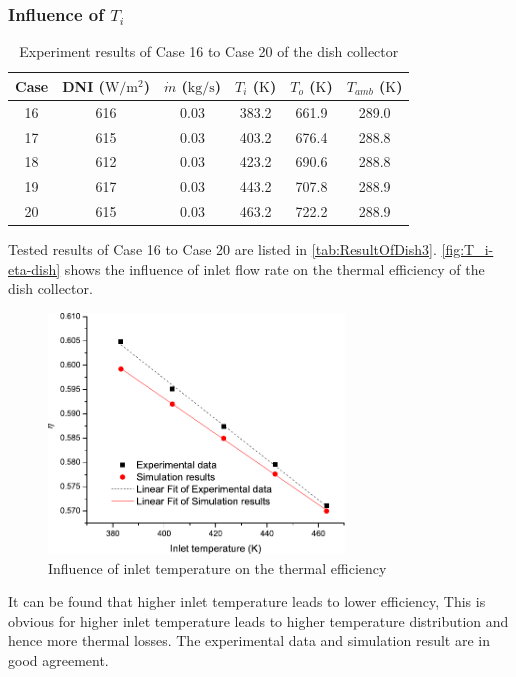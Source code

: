 \subsubsection{Influence of $T_i$}

\begin{table}[htbp]\footnotesize
	\caption{Experiment results of Case 16 to Case 20 of the dish collector}
	\centering
	\begin{tabular}{cccccc}
		\toprule
		Case	& DNI ($\mathrm{W/m^2}$)	&	$\dot{m}$ ($\mathrm{kg/s}$)			&	$T_i$ ($\mathrm{K}$)	&	$T_o$ ($\mathrm{K}$)		&	$T_{amb}$ ($\mathrm{K}$)\\
		\midrule
		16	&	616	&	0.03	&	383.2	&	661.9	&	289.0\\
		17	&	615	&	0.03	&	403.2	&	676.4	&	288.8\\
		18	&	612	&	0.03	&	423.2	&	690.6	&	288.8	\\
		19	&	617	&	0.03	&	443.2	&	707.8	&	288.9\\
		20	&	615	&	0.03	&	463.2	&	722.2	&	288.9\\
		\bottomrule
	\end{tabular}
	
	\label{tab:ResultOfDish3}
\end{table}
Tested results of Case 16 to Case 20 are listed in \autoref{tab:ResultOfDish3}.
\autoref{fig:T_i-eta-dish} shows the influence of inlet flow rate on the thermal efficiency of the dish collector.
\begin{figure}[!ht]
\centering
\includegraphics[width=0.7\textwidth]{fig/T_i-eta-dish}
\caption{Influence of inlet temperature on the thermal efficiency}
\label{fig:T_i-eta-dish}
\end{figure}

It can be found that higher inlet temperature leads to lower efficiency, This is obvious for higher inlet temperature leads to higher temperature distribution and hence more thermal losses. The experimental data and simulation result are in good agreement.


